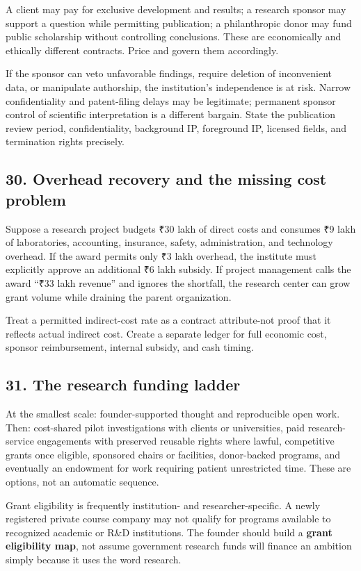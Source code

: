 A client may pay for exclusive development and results; a research sponsor may support a question while permitting publication; a philanthropic donor may fund public scholarship without controlling conclusions. These are economically and ethically different contracts. Price and govern them accordingly.

If the sponsor can veto unfavorable findings, require deletion of inconvenient data, or manipulate authorship, the institution's independence is at risk. Narrow confidentiality and patent-filing delays may be legitimate; permanent sponsor control of scientific interpretation is a different bargain. State the publication review period, confidentiality, background IP, foreground IP, licensed fields, and termination rights precisely.

\subsection{30. Overhead recovery and the missing cost problem}

Suppose a research project budgets ₹30 lakh of direct costs and consumes ₹9 lakh of laboratories, accounting, insurance, safety, administration, and technology overhead. If the award permits only ₹3 lakh overhead, the institute must explicitly approve an additional ₹6 lakh subsidy. If project management calls the award ``₹33 lakh revenue'' and ignores the shortfall, the research center can grow grant volume while draining the parent organization.

Treat a permitted indirect-cost rate as a contract attribute-not proof that it reflects actual indirect cost. Create a separate ledger for full economic cost, sponsor reimbursement, internal subsidy, and cash timing.

\subsection{31. The research funding ladder}

At the smallest scale: founder-supported thought and reproducible open work. Then: cost-shared pilot investigations with clients or universities, paid research-service engagements with preserved reusable rights where lawful, competitive grants once eligible, sponsored chairs or facilities, donor-backed programs, and eventually an endowment for work requiring patient unrestricted time. These are options, not an automatic sequence.

Grant eligibility is frequently institution- and researcher-specific. A newly registered private course company may not qualify for programs available to recognized academic or R\&D institutions. The founder should build a \textbf{grant eligibility map}, not assume government research funds will finance an ambition simply because it uses the word research.

